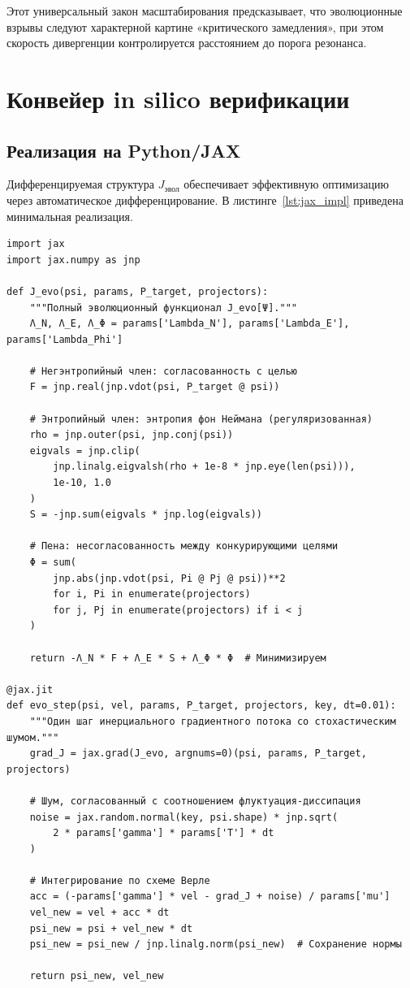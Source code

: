 \documentclass[11pt,a4paper]{article}
\theoremstyle{plain}
\theoremstyle{definition}
\theoremstyle{remark}
\begin{document}
\noindent Этот универсальный закон масштабирования предсказывает, что эволюционные взрывы следуют характерной картине «критического замедления», при этом скорость дивергенции контролируется расстоянием до порога резонанса.

\section{Конвейер in silico верификации}
\label{sec:verification}

\subsection{Реализация на Python/JAX}

Дифференцируемая структура $J_{\text{эвол}}$ обеспечивает эффективную оптимизацию через автоматическое дифференцирование. В листинге~\ref{lst:jax_impl} приведена минимальная реализация.

\begin{lstlisting}[caption={Ядро динамики GRA на JAX}, label={lst:jax_impl}]
import jax
import jax.numpy as jnp

def J_evo(psi, params, P_target, projectors):
    """Полный эволюционный функционал J_evo[Ψ]."""
    Λ_N, Λ_E, Λ_Φ = params['Lambda_N'], params['Lambda_E'], params['Lambda_Phi']
    
    # Негэнтропийный член: согласованность с целью
    F = jnp.real(jnp.vdot(psi, P_target @ psi))
    
    # Энтропийный член: энтропия фон Неймана (регуляризованная)
    rho = jnp.outer(psi, jnp.conj(psi))
    eigvals = jnp.clip(
        jnp.linalg.eigvalsh(rho + 1e-8 * jnp.eye(len(psi))), 
        1e-10, 1.0
    )
    S = -jnp.sum(eigvals * jnp.log(eigvals))
    
    # Пена: несогласованность между конкурирующими целями
    Φ = sum(
        jnp.abs(jnp.vdot(psi, Pi @ Pj @ psi))**2 
        for i, Pi in enumerate(projectors) 
        for j, Pj in enumerate(projectors) if i < j
    )
    
    return -Λ_N * F + Λ_E * S + Λ_Φ * Φ  # Минимизируем

@jax.jit
def evo_step(psi, vel, params, P_target, projectors, key, dt=0.01):
    """Один шаг инерциального градиентного потока со стохастическим шумом."""
    grad_J = jax.grad(J_evo, argnums=0)(psi, params, P_target, projectors)
    
    # Шум, согласованный с соотношением флуктуация-диссипация
    noise = jax.random.normal(key, psi.shape) * jnp.sqrt(
        2 * params['gamma'] * params['T'] * dt
    )
    
    # Интегрирование по схеме Верле
    acc = (-params['gamma'] * vel - grad_J + noise) / params['mu']
    vel_new = vel + acc * dt
    psi_new = psi + vel_new * dt
    psi_new = psi_new / jnp.linalg.norm(psi_new)  # Сохранение нормы
    
    return psi_new, vel_new
\end{lstlisting}
\end{document}
